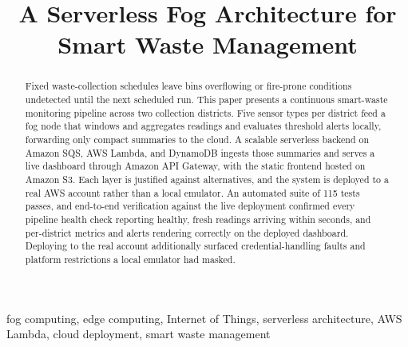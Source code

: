 \documentclass[conference]{IEEEtran}
\begin{document}
\title{A Serverless Fog Architecture for Smart Waste Management}

\author{
}

\maketitle
{}

\begin{abstract}
Fixed waste-collection schedules leave bins overflowing or fire-prone conditions undetected until the next scheduled run. This paper presents a continuous smart-waste monitoring pipeline across two collection districts. Five sensor types per district feed a fog node that windows and aggregates readings and evaluates threshold alerts locally, forwarding only compact summaries to the cloud. A scalable serverless backend on Amazon SQS, AWS Lambda, and DynamoDB ingests those summaries and serves a live dashboard through Amazon API Gateway, with the static frontend hosted on Amazon S3. Each layer is justified against alternatives, and the system is deployed to a real AWS account rather than a local emulator. An automated suite of 115 tests passes, and end-to-end verification against the live deployment confirmed every pipeline health check reporting healthy, fresh readings arriving within seconds, and per-district metrics and alerts rendering correctly on the deployed dashboard. Deploying to the real account additionally surfaced credential-handling faults and platform restrictions a local emulator had masked.
\end{abstract}

\begin{IEEEkeywords}
fog computing, edge computing, Internet of Things, serverless architecture, AWS Lambda, cloud deployment, smart waste management
\end{IEEEkeywords}
\end{document}
